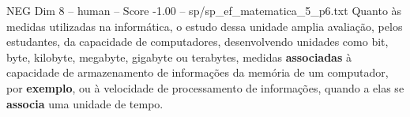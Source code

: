 \begin{textsample}{NEG Dim 8 – human – Score -1.00 – sp/sp\_ef\_matematica\_5\_p6.txt}  \label{ex:f8_neg_015}
Quanto às medidas utilizadas na informática, o estudo dessa unidade amplia avaliação, pelos estudantes, da capacidade de computadores, desenvolvendo unidades como bit, byte, kilobyte, megabyte, gigabyte ou terabytes, medidas \textbf{associadas} à capacidade de armazenamento de informações da memória de um computador, por \textbf{exemplo}, ou à velocidade de processamento de informações, quando a elas se \textbf{associa} uma unidade de tempo.

\end{textsample}
